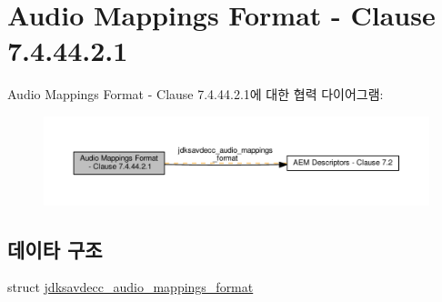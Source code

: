 \hypertarget{group__audio__mappings__format}{}\section{Audio Mappings Format -\/ Clause 7.4.44.2.1}
\label{group__audio__mappings__format}
Audio Mappings Format -\/ Clause 7.4.44.2.1에 대한 협력 다이어그램\+:
\nopagebreak
\begin{figure}[H]
\begin{center}
\leavevmode
\includegraphics[width=350pt]{group__audio__mappings__format}
\end{center}
\end{figure}
\subsection*{데이타 구조}
\begin{DoxyCompactItemize}
\item 
struct \hyperlink{structjdksavdecc__audio__mappings__format}{jdksavdecc\+\_\+audio\+\_\+mappings\+\_\+format}
\end{DoxyCompactItemize}
